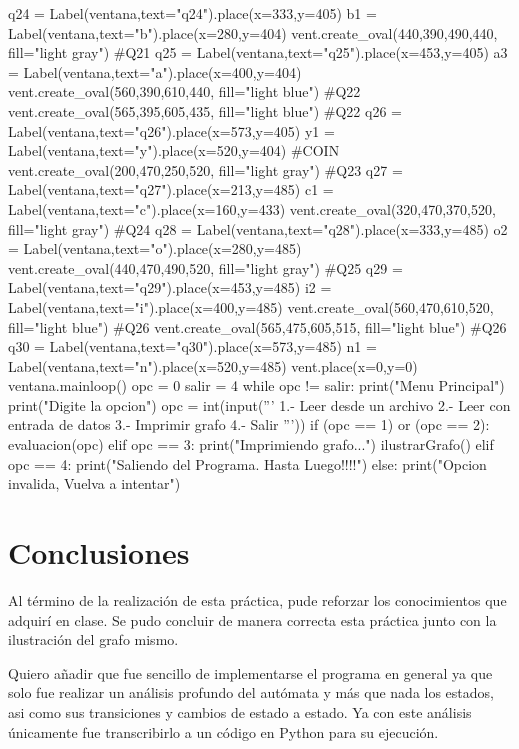 \documentclass{article}
\begin{document}
\begin{python}
			q24 = Label(ventana,text="q24").place(x=333,y=405)
			b1 = Label(ventana,text="b").place(x=280,y=404)
			vent.create_oval(440,390,490,440, fill="light gray") #Q21
			q25 = Label(ventana,text="q25").place(x=453,y=405)
			a3 = Label(ventana,text="a").place(x=400,y=404)
			vent.create_oval(560,390,610,440, fill="light blue") #Q22
			vent.create_oval(565,395,605,435, fill="light blue") #Q22
			q26 = Label(ventana,text="q26").place(x=573,y=405)
			y1 = Label(ventana,text="y").place(x=520,y=404)   
			#COIN
			vent.create_oval(200,470,250,520, fill="light gray") #Q23
			q27 = Label(ventana,text="q27").place(x=213,y=485)
			c1 = Label(ventana,text="c").place(x=160,y=433)
			vent.create_oval(320,470,370,520, fill="light gray") #Q24
			q28 = Label(ventana,text="q28").place(x=333,y=485)
			o2 = Label(ventana,text="o").place(x=280,y=485)
			vent.create_oval(440,470,490,520, fill="light gray") #Q25
			q29 = Label(ventana,text="q29").place(x=453,y=485)
			i2 = Label(ventana,text="i").place(x=400,y=485)
			vent.create_oval(560,470,610,520, fill="light blue") #Q26
			vent.create_oval(565,475,605,515, fill="light blue") #Q26
			q30 = Label(ventana,text="q30").place(x=573,y=485)
			n1 = Label(ventana,text="n").place(x=520,y=485)        
			vent.place(x=0,y=0)
			ventana.mainloop()	
		opc = 0
		salir = 4
		while opc != salir:
		print("Menu Principal")
		print("Digite la opcion")
		opc = int(input('''
			1.- Leer desde un archivo
			2.- Leer con entrada de datos
			3.- Imprimir grafo
			4.- Salir
			'''))    
		if (opc == 1) or (opc == 2):
			evaluacion(opc)    
			elif opc == 3:
		print("Imprimiendo grafo...")
			ilustrarGrafo()
		elif opc == 4:
			print("Saliendo del Programa. Hasta Luego!!!!")
		else:
			print("Opcion invalida, Vuelva a intentar")
	\end{python}
	
	\section*{Conclusiones}
	Al término de la realización de esta práctica, pude reforzar los conocimientos que adquirí en clase. Se pudo concluir de manera correcta esta práctica junto con la ilustración del grafo mismo.
	
	Quiero añadir que fue sencillo de implementarse el programa en general ya que solo fue realizar un análisis profundo del autómata y más que nada los estados, asi como sus transiciones y cambios de estado a estado. Ya con este análisis únicamente fue transcribirlo a un código en Python para su ejecución.
	
\end{document}

